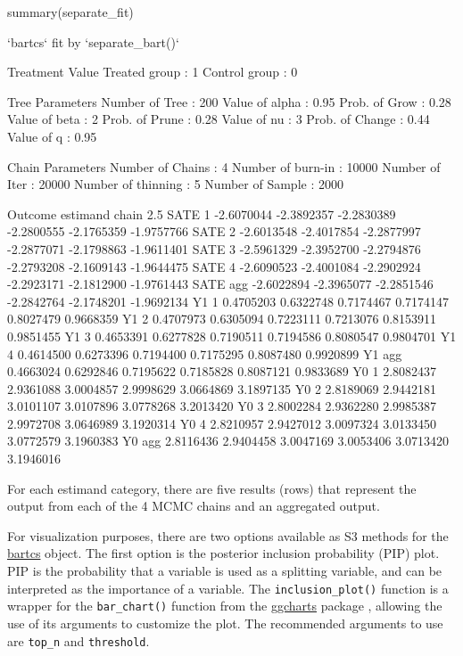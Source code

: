 \begin{example}
summary(separate_fit)

`bartcs` fit by `separate_bart()`

Treatment Value
  Treated group    :      1
  Control group    :      0

Tree Parameters
  Number of Tree   :    200		Value  of alpha    :   0.95
  Prob.  of Grow   :   0.28		Value  of beta     :      2
  Prob.  of Prune  :   0.28		Value  of nu       :      3
  Prob.  of Change :   0.44		Value  of q        :   0.95

Chain Parameters
  Number of Chains :      4		Number of burn-in  :  10000
  Number of Iter   :  20000		Number of thinning :      5
  Number of Sample :   2000

Outcome 
 estimand chain       2.5%
     SATE     1 -2.6070044 -2.3892357 -2.2830389 -2.2800555 -2.1765359 -1.9757766
     SATE     2 -2.6013548 -2.4017854 -2.2877997 -2.2877071 -2.1798863 -1.9611401
     SATE     3 -2.5961329 -2.3952700 -2.2794876 -2.2793208 -2.1609143 -1.9644475
     SATE     4 -2.6090523 -2.4001084 -2.2902924 -2.2923171 -2.1812900 -1.9761443
     SATE   agg -2.6022894 -2.3965077 -2.2851546 -2.2842764 -2.1748201 -1.9692134
       Y1     1  0.4705203  0.6322748  0.7174467  0.7174147  0.8027479  0.9668359
       Y1     2  0.4707973  0.6305094  0.7223111  0.7213076  0.8153911  0.9851455
       Y1     3  0.4653391  0.6277828  0.7190511  0.7194586  0.8080547  0.9804701
       Y1     4  0.4614500  0.6273396  0.7194400  0.7175295  0.8087480  0.9920899
       Y1   agg  0.4663024  0.6292846  0.7195622  0.7185828  0.8087121  0.9833689
       Y0     1  2.8082437  2.9361088  3.0004857  2.9998629  3.0664869  3.1897135
       Y0     2  2.8189069  2.9442181  3.0101107  3.0107896  3.0778268  3.2013420
       Y0     3  2.8002284  2.9362280  2.9985387  2.9972708  3.0646989  3.1920314
       Y0     4  2.8210957  2.9427012  3.0097324  3.0133450  3.0772579  3.1960383
       Y0   agg  2.8116436  2.9404458  3.0047169  3.0053406  3.0713420  3.1946016
\end{example}
For each estimand category, there are five results (rows) that represent the output from each of the 4 MCMC chains and an aggregated output.

For visualization purposes, there are two options available as S3 methods for the \href{https://CRAN.R-project.org/package=bartcs}{bartcs} object. The first option is the posterior inclusion probability (PIP) plot. PIP is the probability that a variable is used as a splitting variable, and can be interpreted as the importance of a variable. The \verb|inclusion_plot()| function is a wrapper for the \verb|bar_chart()| function from the \href{https://cran.r-project.org/package=ggcharts}{ggcharts} package \citep{ggcharts}, allowing the use of its arguments to customize the plot. The recommended arguments to use are \verb|top_n| and \verb|threshold|.

